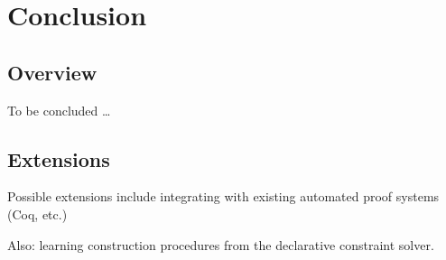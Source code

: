 \chapter{Conclusion}
\label{chap:conclusion}

\section{Overview}

To be concluded \ldots

\section{Extensions}

Possible extensions include integrating with existing automated proof
systems (Coq, etc.)

Also: learning construction procedures from the declarative constraint
solver.
